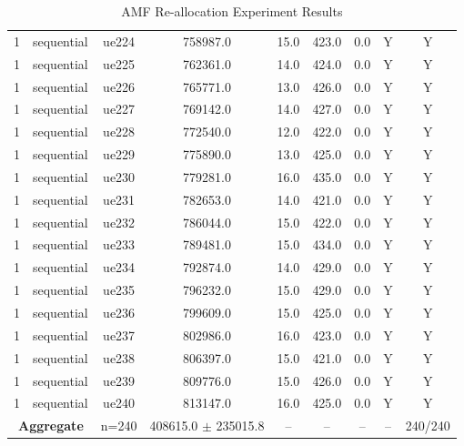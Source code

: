 \begin{table}[ht]
\begin{tabular}{|c|c|c|c|c|c|c|c|c|}
1 & sequential & ue224 & 758987.0 & 15.0 & 423.0 & 0.0 & Y & Y \\
1 & sequential & ue225 & 762361.0 & 14.0 & 424.0 & 0.0 & Y & Y \\
1 & sequential & ue226 & 765771.0 & 13.0 & 426.0 & 0.0 & Y & Y \\
1 & sequential & ue227 & 769142.0 & 14.0 & 427.0 & 0.0 & Y & Y \\
1 & sequential & ue228 & 772540.0 & 12.0 & 422.0 & 0.0 & Y & Y \\
1 & sequential & ue229 & 775890.0 & 13.0 & 425.0 & 0.0 & Y & Y \\
1 & sequential & ue230 & 779281.0 & 16.0 & 435.0 & 0.0 & Y & Y \\
1 & sequential & ue231 & 782653.0 & 14.0 & 421.0 & 0.0 & Y & Y \\
1 & sequential & ue232 & 786044.0 & 15.0 & 422.0 & 0.0 & Y & Y \\
1 & sequential & ue233 & 789481.0 & 15.0 & 434.0 & 0.0 & Y & Y \\
1 & sequential & ue234 & 792874.0 & 14.0 & 429.0 & 0.0 & Y & Y \\
1 & sequential & ue235 & 796232.0 & 15.0 & 429.0 & 0.0 & Y & Y \\
1 & sequential & ue236 & 799609.0 & 15.0 & 425.0 & 0.0 & Y & Y \\
1 & sequential & ue237 & 802986.0 & 16.0 & 423.0 & 0.0 & Y & Y \\
1 & sequential & ue238 & 806397.0 & 15.0 & 421.0 & 0.0 & Y & Y \\
1 & sequential & ue239 & 809776.0 & 15.0 & 426.0 & 0.0 & Y & Y \\
1 & sequential & ue240 & 813147.0 & 16.0 & 425.0 & 0.0 & Y & Y \\
\multicolumn{2}{|c|}{\textbf{Aggregate}} & n=240 & 408615.0 $\pm$ 235015.8 & -- & -- & -- & -- & 240/240 \\
\hline
\end{tabular}
\caption{AMF Re-allocation Experiment Results}
\label{tab:amf_realloc}
\end{table}
